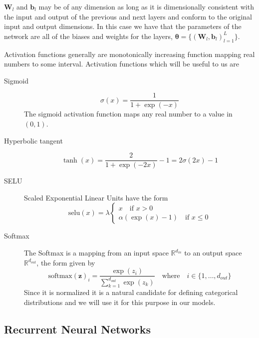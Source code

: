 $\bm{W}_l$ and $\bm{b}_l$ may be of any dimension as long as it is dimensionally consistent
with the input and output of the previous and next layers and conform to the
original input and output dimensions. In this case we have that the parameters
of the network are all of the biases and weights for the layers, $\bm{\theta} =
\{(\bm{W}_l, \bm{b}_l)_{l = 1}^L\}$.

Activation functions generally are monotonically increasing function mapping real
numbers to some interval. Activation functions which will be useful to us are
\begin{description}
\item[Sigmoid]
  \begin{equation}
    \label{eq:sigmoid}
    \sigma(x) = \frac{1}{1 + \exp(-x)}
  \end{equation}
  The sigmoid activation function maps any real number to a value in $(0, 1)$.
\item[Hyperbolic tangent]
  \begin{equation}
    \label{eq:tanh}
    \tanh(x) = \frac{2}{1 + \exp(-2x)} - 1 = 2 \sigma(2x) - 1
  \end{equation}
\item[SELU]
  Scaled Exponential Linear Units \cite{DBLP:journals/corr/KlambauerUMH17} have the form
  \begin{equation}
    \label{eq:SELU}
    \text{selu}(x) = \lambda
    \begin{cases}
      x \quad\text{if $x > 0$} \\
      \alpha(\exp(x) - 1) \quad \text{if $x \leq 0$}
    \end{cases}
  \end{equation}
\item[Softmax]
  The Softmax is a mapping from an input space $\mathbb{R}^{d_{in}}$ to an output
  space $\mathbb{R}^{d_{out}}$, the form given by
  \begin{equation}
    \label{eq:softmax}
    \text{softmax}(\bm{z})_i = \frac{\exp(z_i)}{\sum_{k=1}^{d_{out}}\exp(z_k)} \quad \text{where} \quad i \in \{1, \dots, d_{out}\}
  \end{equation}
  Since it is normalized it is a natural candidate for defining categorical
  distributions \cite{Barber:2012:BRM:2207809} and we will use it for this
  purpose in our models.
\end{description}

\subsection{Recurrent Neural Networks}

